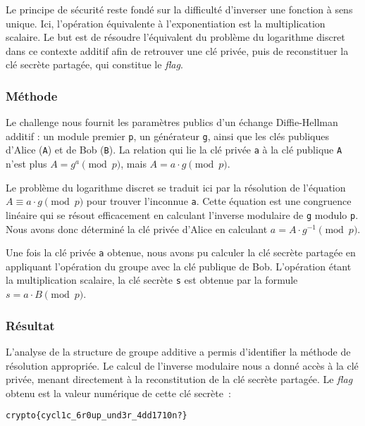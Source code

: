     Le principe de sécurité reste fondé sur la difficulté d'inverser une
    fonction à sens unique. Ici, l'opération équivalente à l'exponentiation est
    la multiplication scalaire. Le but est de résoudre l'équivalent du problème
    du logarithme discret dans ce contexte additif afin de retrouver une clé
    privée, puis de reconstituer la clé secrète partagée, qui constitue le
    \textit{flag}.

    \subsubsection{Méthode}
    Le challenge nous fournit les paramètres publics d'un échange
    Diffie-Hellman additif : un module premier \texttt{p}, un générateur
    \texttt{g}, ainsi que les clés publiques d'Alice (\texttt{A}) et de Bob
    (\texttt{B}). La relation qui lie la clé privée \texttt{a} à la clé
    publique \texttt{A} n'est plus $A = g^a \pmod{p}$, mais
    $A = a \cdot g \pmod{p}$.

    Le problème du logarithme discret se traduit ici par la résolution de
    l'équation $A \equiv a \cdot g \pmod{p}$ pour trouver l'inconnue
    \texttt{a}. Cette équation est une congruence linéaire qui se résout
    efficacement en calculant l'inverse modulaire de \texttt{g} modulo
    \texttt{p}. Nous avons donc déterminé la clé privée d'Alice en calculant
    $a = A \cdot g^{-1} \pmod{p}$.

    Une fois la clé privée \texttt{a} obtenue, nous avons pu calculer la clé
    secrète partagée en appliquant l'opération du groupe avec la clé publique
    de Bob. L'opération étant la multiplication scalaire, la clé secrète
    \texttt{s} est obtenue par la formule $s = a \cdot B \pmod{p}$.

    \subsubsection{Résultat}
    L'analyse de la structure de groupe additive a permis d'identifier la
    méthode de résolution appropriée. Le calcul de l'inverse modulaire nous a
    donné accès à la clé privée, menant directement à la reconstitution de la
    clé secrète partagée. Le \textit{flag} obtenu est la valeur numérique de
    cette clé secrète~:

    \begin{center}
        \texttt{crypto\{cycl1c\_6r0up\_und3r\_4dd1710n?\}}
    \end{center}
